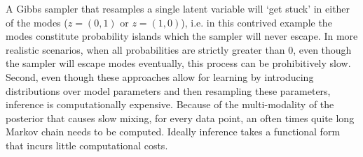\documentclass[11pt]{cmuthesis} %
\begin{document}
A Gibbs sampler that resamples a single latent variable will `get stuck' in either of the modes ($z = (0,1)$ or $z = (1,0)$), i.e. in this contrived example the modes constitute probability islands which the sampler will never escape. In more realistic scenarios, when all probabilities are strictly greater than 0, even though the sampler will escape modes eventually, this process can be prohibitively slow. Second, even though these approaches allow for learning by introducing distributions over model parameters and then resampling these parameters, inference is computationally expensive. Because of the multi-modality of the posterior that causes slow mixing, for every data point, an often times quite long Markov chain needs to be computed. Ideally inference takes a functional form that incurs little computational costs.
\end{document}
